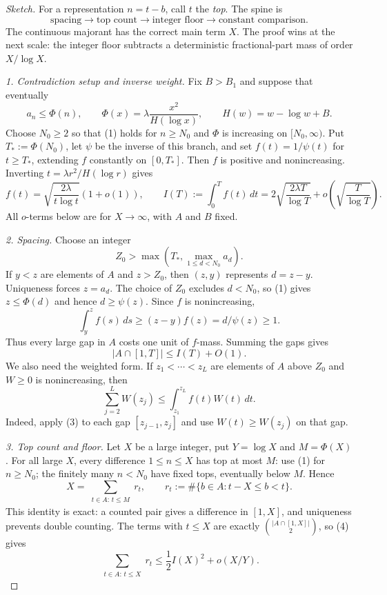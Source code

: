 \documentclass[10pt]{article}
\newcommand{\dd}{\,d}
\begin{document}
\begin{proof}[Sketch]
For a representation $n=t-b$, call $t$ the \emph{top}.  The spine is
\[
        \text{spacing}\longrightarrow \text{top count}\longrightarrow
        \text{integer floor}\longrightarrow \text{constant comparison}.
\]
The continuous majorant has the correct main term $X$.  The proof wins at the
next scale: the integer floor subtracts a deterministic fractional-part mass of
order $X/\log X$.

\smallskip
\noindent\textit{1. Contradiction setup and inverse weight.}
Fix $B>B_1$ and suppose that eventually
\[
        a_n\le \Phi(n),
        \qquad
        \Phi(x)=\lambda\frac{x^2}{H(\log x)},
        \qquad
        H(w)=w-\log w+B.                                      \tag{1}
\]
Choose $N_0\ge2$ so that (1) holds for $n\ge N_0$ and $\Phi$ is increasing on
$[N_0,\infty)$.  Put $T_*:=\Phi(N_0)$, let $\psi$ be the inverse of this branch,
and set $f(t)=1/\psi(t)$ for $t\ge T_*$, extending $f$ constantly on $[0,T_*]$.
Then $f$ is positive and nonincreasing.  Inverting
$t=\lambda r^2/H(\log r)$ gives
\[
        f(t)=\sqrt{\frac{2\lambda}{t\log t}}(1+o(1)),
        \qquad
        I(T):=\int_0^T f(t)\dd t
        =2\sqrt{\frac{2\lambda T}{\log T}}
        +o\!\left(\sqrt{\frac T{\log T}}\right).              \tag{2}
\]
All $o$-terms below are for $X\to\infty$, with $A$ and $B$ fixed.

\smallskip
\noindent\textit{2. Spacing.}
Choose an integer
\[
        Z_0>\max\left(T_*,\max_{1\le d<N_0}a_d\right).
\]
If $y<z$ are elements of $A$ and $z>Z_0$, then $(z,y)$ represents $d=z-y$.
Uniqueness forces $z=a_d$.  The choice of $Z_0$ excludes $d<N_0$, so (1) gives
$z\le\Phi(d)$ and hence $d\ge\psi(z)$.  Since $f$ is nonincreasing,
\[
        \int_y^z f(s)\dd s\ge (z-y)f(z)=d/\psi(z)\ge1.         \tag{3}
\]
Thus every large gap in $A$ costs one unit of $f$-mass.  Summing the gaps gives
\[
        |A\cap[1,T]|\le I(T)+O(1).                            \tag{4}
\]
We also need the weighted form.  If $z_1<\cdots<z_L$ are elements of $A$ above
$Z_0$ and $W\ge0$ is nonincreasing, then
\[
        \sum_{j=2}^L W(z_j)
        \le \int_{z_1}^{z_L} f(t)W(t)\dd t.                   \tag{5}
\]
Indeed, apply (3) to each gap $[z_{j-1},z_j]$ and use
$W(t)\ge W(z_j)$ on that gap.

\smallskip
\noindent\textit{3. Top count and floor.}
Let $X$ be a large integer, put $Y=\log X$ and $M=\Phi(X)$.  For all large
$X$, every difference $1\le n\le X$ has top at most $M$: use (1) for
$n\ge N_0$; the finitely many $n<N_0$ have fixed tops, eventually below $M$.
Hence
\[
        X=\sum_{\substack{t\in A:\,t\le M}} r_t,
        \qquad
        r_t:=\#\{b\in A:t-X\le b<t\}.                         \tag{6}
\]
This identity is exact: a counted pair gives a difference in $[1,X]$, and
uniqueness prevents double counting.  The terms with $t\le X$ are exactly
$\binom{|A\cap[1,X]|}{2}$, so (4) gives
\[
        \sum_{\substack{t\in A:\,t\le X}} r_t
        \le \frac12 I(X)^2+o(X/Y).                            \tag{7}
\]


\end{proof}
\end{document}
